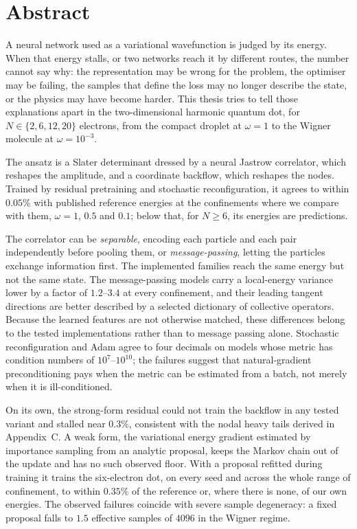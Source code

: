 \chapter*{Abstract}

A neural network used as a variational wavefunction is judged by its energy. When that energy
stalls, or two networks reach it by different routes, the number cannot say why: the
representation may be wrong for the problem, the optimiser may be failing, the samples that
define the loss may no longer describe the state, or the physics may have become harder. This
thesis tries to tell those explanations apart in the two-dimensional harmonic quantum dot, for
$N\in\{2,6,12,20\}$ electrons, from the compact droplet at $\omega=1$ to the Wigner molecule at
$\omega=10^{-3}$.

The ansatz is a Slater determinant dressed by a neural Jastrow correlator, which reshapes the
amplitude, and a coordinate backflow, which reshapes the nodes. Trained by residual
pretraining and stochastic reconfiguration, it agrees to within $0.05\%$ with published
reference energies at the confinements where we compare with them, $\omega=1$, $0.5$ and
$0.1$; below that, for $N\ge6$, its energies are predictions.

The correlator can be \emph{separable}, encoding each particle and each pair independently
before pooling them, or \emph{message-passing}, letting the particles exchange information
first. The implemented families reach the same energy but not the same state. The
message-passing models carry a local-energy variance lower by a factor of $1.2$--$3.4$ at
every confinement, and their leading tangent directions are better described by a selected
dictionary of collective operators. Because the learned features are not otherwise matched,
these differences belong to the tested implementations rather than to message passing alone. Stochastic
reconfiguration and Adam agree to four decimals on models whose metric has condition numbers
of $10^{7}$--$10^{10}$; the failures suggest that natural-gradient preconditioning pays when
the metric can be estimated from a batch, not merely when it is ill-conditioned.

On its own, the strong-form residual could not train the backflow in any tested variant and
stalled near $0.3\%$, consistent with the nodal heavy tails derived in Appendix~C. A weak
form, the variational energy gradient estimated by importance sampling from an analytic
proposal, keeps the Markov chain out of the update and has no such observed floor. With a proposal refitted during training it trains
the six-electron dot, on every seed and across the whole range of confinement, to within
$0.35\%$ of the reference or, where there is none, of our own energies. The observed
failures coincide with severe sample degeneracy: a fixed proposal falls to $1.5$ effective
samples of $4096$ in the Wigner regime.

